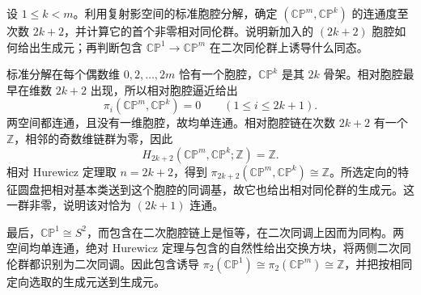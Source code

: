 \begin{exercise}\label{g2:ex:hurewicz-projective-pair}
	设 \(1\le k<m\)。利用复射影空间的标准胞腔分解，确定 \((\mathbb{CP}^m,\mathbb{CP}^k)\) 的连通度至次数 \(2k+2\)，并计算它的首个非零相对同伦群。说明新加入的 \((2k+2)\) 胞腔如何给出生成元；再判断包含 \(\mathbb{CP}^1\to\mathbb{CP}^m\) 在二次同伦群上诱导什么同态。
\end{exercise}
\begin{solution}
	标准分解在每个偶数维 \(0,2,\ldots,2m\) 恰有一个胞腔，\(\mathbb{CP}^k\) 是其 \(2k\) 骨架。相对胞腔最早在维数 \(2k+2\) 出现，所以相对胞腔逼近给出
	\[
		\pi_i(\mathbb{CP}^m,\mathbb{CP}^k)=0\qquad(1\le i\le2k+1).
	\]
	两空间都连通，且没有一维胞腔，故均单连通。相对胞腔链在次数 \(2k+2\) 有一个 \(\mathbb Z\)，相邻的奇数维链群为零，因此
	\[
		H_{2k+2}(\mathbb{CP}^m,\mathbb{CP}^k;\mathbb Z)=\mathbb Z.
	\]
	相对 Hurewicz 定理取 \(n=2k+2\)，得到 \(\pi_{2k+2}(\mathbb{CP}^m,\mathbb{CP}^k)\cong\mathbb Z\)。所选定向的特征圆盘把相对基本类送到这个胞腔的同调基，故它也给出相对同伦群的生成元。这一群非零，说明该对恰为 \((2k+1)\) 连通。

	最后，\(\mathbb{CP}^1\cong S^2\)，而包含在二次胞腔链上是恒等，在二次同调上因而为同构。两空间均单连通，绝对 Hurewicz 定理与包含的自然性给出交换方块，将两侧二次同伦群都识别为二次同调。因此包含诱导 \(\pi_2(\mathbb{CP}^1)\cong\pi_2(\mathbb{CP}^m)\cong\mathbb Z\)，并把按相同定向选取的生成元送到生成元。
\end{solution}

